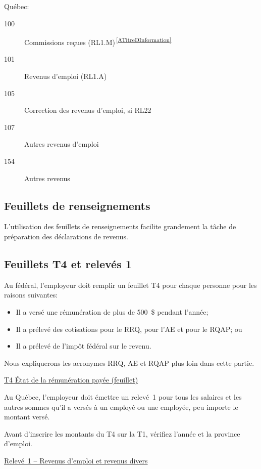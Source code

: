 Québec:
\qc
\begin{description}
	\item[100] Commissions reçues (RL1.M)\textsuperscript{\,\ref{ATitreDInformation}}
	\item[101] Revenus d'emploi (RL1.A)
	\item[105] Correction des revenus d'emploi, si RL22
	\item[107] Autres revenus d'emploi
	\item[154] Autres revenus
\end{description}


\subsection{Feuillets de renseignements}
L'utilisation des feuillets de renseignements facilite grandement la tâche de préparation des déclarations de revenus.


\subsection{Feuillets T4 et relevés 1}
\ca
Au fédéral, l'employeur doit remplir un feuillet T4 pour chaque personne pour les raisons suivantes:
\begin{itemize}
	\item Il a versé une rémunération de plus de 500~\$ pendant l'année;
	\item Il a prélevé des cotisations pour le RRQ, pour l'AE et pour le RQAP; ou
	\item Il a prélevé de l'impôt fédéral sur le revenu.
\end{itemize}

\begin{note}
	Nous expliquerons les acronymes RRQ, AE et RQAP plus loin dans cette partie.
\end{note}
\cat\href{https://www.canada.ca/fr/agence-revenu/services/formulaires-publications/formulaires/t4.html}{T4 État de la rémunération payée (feuillet)}

\qc
Au Québec, l'employeur doit émettre un relevé~1 pour tous les salaires et les autres sommes qu'il a versés à un employé ou une employée, peu importe le montant versé.

\begin{note}
	Avant d'inscrire les montants du T4 sur la T1, vérifiez l'année et la province d'emploi.
\end{note}
\qct\href{https://www.revenuquebec.ca/fr/services-en-ligne/formulaires-et-publications/details-courant/rl-1/}{Relevé~1 – Revenus d'emploi et revenus divers }


